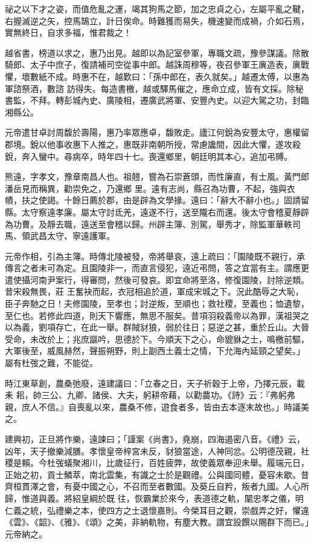 \begin{pinyinscope}
 祕之以下才之姿，而值危亂之運，竭其狗馬之節，加之忠貞之心，左屬平亂之鞬，右握滅逆之矢，控馬鵠立，計日俟命。時難獲而易失，機速變而成禍，介如石焉，實無終日，自求多福，惟君裁之！



 越省書，榜道以求之，惠乃出見。越即以為記室參軍，專職文疏，豫參謀議。除散騎郎、太子中庶子，復請補司空從事中郎。越誅周穆等，夜召參軍王廙造表，廙戰懼，壞數紙不成。時惠不在，越歎曰：「孫中郎在，表久就矣。」越遷太傅，以惠為軍諮祭酒，數諮
 訪得失。每造書檄，越或驛馬催之，應命立成，皆有文採。除秘書監，不拜。轉彭城內史、廣陵相，遷廣武將軍、安豐內史。以迎大駕之功，封臨湘縣公。



 元帝遣甘卓討周馥於壽陽，惠乃率眾應卓，馥敗走。廬江何銳為安豐太守，惠權留郡境。銳以他事收惠下人推之，惠既非南朝所授，常慮讒間，因此大懼，遂攻殺銳，奔入蠻中。尋病卒，時年四十七。喪還鄉里，朝廷明其本心，追加弔賻。



 熊遠，字孝文，豫章南昌人也。祖翹，嘗為石崇蒼頭，而性廉直，有士風。黃門郎潘岳見而稱異，勸崇免之，乃還鄉
 里。遠有志尚，縣召為功曹，不起，強與衣幘，扶之使謁。十餘日薦於郡，由是辟為文學掾。遠曰：「辭大不辭小也。」固請留縣。太守察遠孝廉。屬太守討氐羌，遠遂不行，送至隴右而還。後太守會稽夏靜辟為功曹。及靜去職，遠送至會稽以歸。州辟主簿、別駕，舉秀才，除監軍華軼司馬、領武昌太守、寧遠護軍。



 元帝作相，引為主簿。時傳北陵被發，帝將舉哀，遠上疏曰：「園陵既不親行，承傳言之者未可為定。且園陵非一，而直言侵犯，遠近弔問，答之宜當有主。謂應更遣使攝河南尹案行，得審問，然後可發哀。即宜命將至洛，修復園陵，討除逆類。昔宋殺無畏，莊
 王奮袂而起，衣冠相追於道，軍成宋城之下。況此酷辱之大恥，臣子奔馳之日！夫修園陵，至孝也；討逆叛，至順也；救社稷，至義也；恤遺黎，至仁也。若修此四道，則天下響應，無思不服矣。昔項羽殺義帝以為罪，漢祖哭之以為義，劉項存亡，在此一舉。群賊豺狼，弱於往日；惡逆之甚，重於丘山。大晉受命，未改於上；兆庶謳吟，思德於下。今順天下之心，命貔貅之士，鳴檄前驅，大軍後至，威風赫然，聲振朔野，則上副西土義士之情，下允海內延頸之望矣。」屬有杜弢之難，不能從。



 時江東草創，農桑弛廢，遠建議曰：「立春之日，天子祈穀于上帝，乃擇元辰，載耒
 耜，帥三公、九卿、諸侯、大夫，躬耕帝藉，以勸農功。《詩》云：『弗躬弗親，庶人不信。』自喪亂以來，農桑不修，遊食者多，皆由去本逐末故也。」時議美之。



 建興初，正旦將作樂，遠諫曰；「謹案《尚書》，堯崩，四海遏密八音。《禮》云，凶年，天子撤樂減膳。孝懷皇帝梓宮未反，豺狼當途，人神同忿。公明德茂親，社稷是賴。今杜弢蟻聚湘川，比歲征行，百姓疲弊，故使義眾奉迎未舉。履端元日，正始之初，貢士鱗萃，南北雲集，有識之士於是觀禮。公與國同體，憂容未歇。昔齊桓貫澤之會，有憂中國之心，不召而至者數國。及葵丘自矜，叛者九國。人心所歸，惟道與義。將紹皇綱於既
 往，恢霸業於來今，表道德之軌，闡忠孝之儀，明仁義之統，弘禮樂之本，使四方之士退懷嘉則。今榮耳目之觀，崇戲弄之好，懼違《雲》、《韶》、《雅》、《頌》之美，非納軌物，有塵大教。謂宜設饌以賜群下而已。」元帝納之。




\end{pinyinscope}
